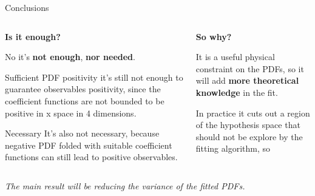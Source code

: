 \documentclass[8pt]{beamer}
\begin{document}
\begin{frame}{Conclusions}
    \begin{columns}
        \begin{column}{0.6\textwidth}
        \textbf{\large Is it enough?}
        \vspace*{10pt}

        No it's \textbf{not enough}, \textbf{nor needed}.
        \begin{block}{Sufficient}
         PDF positivity it's still not enough to guarantee observables
         positivity, since the coefficient functions are not bounded to be
         positive in x space in 4 dimensions.
        \end{block}

        \begin{block}{Necessary}
        It's also not necessary, because negative PDF folded with suitable
        coefficient functions can still lead to positive observables.
        \end{block}

        \end{column}

        \begin{column}{0.4\textwidth}
        \textbf{\large So why?}

        \vspace*{10pt}
        It is a useful physical constraint on the PDFs, so it will add
        \textbf{more theoretical knowledge} in the fit.

        In practice it cuts out a region of the hypothesis space that should not be
        explore by the fitting algorithm, so


        \end{column}
    \end{columns}

    \vspace{20pt}
    \begin{center}
        \textit{The main result will be reducing the variance of the fitted PDFs.}
    \end{center}


\end{frame}
\end{document}
